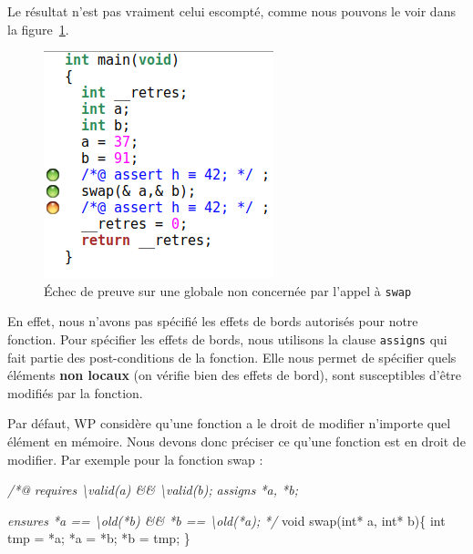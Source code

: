 \documentclass[12pt,francais,]{scrbook}
\newenvironment{Shaded}{}{}
\newcommand{\DataTypeTok}[1]{\textcolor[rgb]{0.56,0.13,0.00}{{#1}}}
\newcommand{\CommentTok}[1]{\textcolor[rgb]{0.38,0.63,0.69}{\textit{{#1}}}}
\newcommand{\NormalTok}[1]{{#1}}
\begin{document}
Le résultat n'est pas vraiment celui escompté, comme nous pouvons le
voir dans la figure~\ref{fig:2-2-2-swap-1}.

\begin{figure}[htbp]
\centering
\includegraphics[scale=0.5]{2-2-2-swap-1.png}
\caption{Échec de preuve sur une globale non concernée par l'appel à
\texttt{swap}}
\label{fig:2-2-2-swap-1}
\end{figure}

En effet, nous n'avons pas spécifié les effets de bords autorisés pour
notre fonction. Pour spécifier les effets de bords, nous utilisons la
clause \texttt{assigns} qui fait partie des post-conditions de la
fonction. Elle nous permet de spécifier quels éléments \textbf{non
locaux} (on vérifie bien des effets de bord), sont susceptibles d'être
modifiés par la fonction.

Par défaut, WP considère qu'une fonction a le droit de modifier
n'importe quel élément en mémoire. Nous devons donc préciser ce qu'une
fonction est en droit de modifier. Par exemple pour la fonction swap :

\begin{footnotesize}\begin{Shaded}
\begin{Highlighting}[]
\CommentTok{/*@}
\CommentTok{  requires \textbackslash{}valid(a) && \textbackslash{}valid(b);}
\CommentTok{ }
\CommentTok{  assigns *a, *b;}

\CommentTok{  ensures  *a == \textbackslash{}old(*b) && *b == \textbackslash{}old(*a);}
\CommentTok{*/}
\DataTypeTok{void} \NormalTok{swap(}\DataTypeTok{int}\NormalTok{* a, }\DataTypeTok{int}\NormalTok{* b)\{}
  \DataTypeTok{int} \NormalTok{tmp = *a;}
  \NormalTok{*a = *b;}
  \NormalTok{*b = tmp;}
\NormalTok{\}}
\end{Highlighting}
\end{Shaded}\end{footnotesize}
\end{document}
